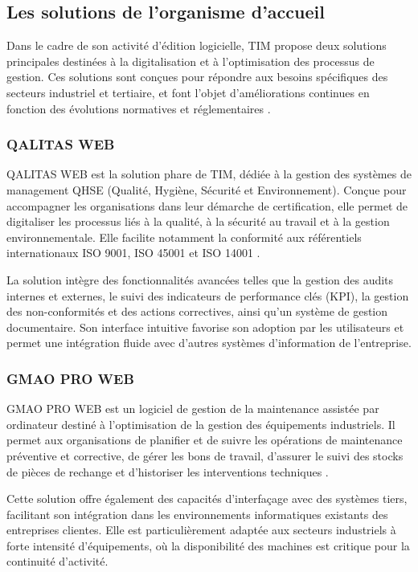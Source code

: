 \documentclass[12pt,a4paper]{report}
\begin{document}
\subsection{Les solutions de l'organisme d'accueil}

Dans le cadre de son activité d'édition logicielle, TIM propose deux solutions principales destinées à la digitalisation et à l'optimisation des processus de gestion. Ces solutions sont conçues pour répondre aux besoins spécifiques des secteurs industriel et tertiaire, et font l'objet d'améliorations continues en fonction des évolutions normatives et réglementaires \cite{tim_site}.

\subsubsection{QALITAS WEB}

QALITAS WEB est la solution phare de TIM, dédiée à la gestion des systèmes de management QHSE (Qualité, Hygiène, Sécurité et Environnement). Conçue pour accompagner les organisations dans leur démarche de certification, elle permet de digitaliser les processus liés à la qualité, à la sécurité au travail et à la gestion environnementale. Elle facilite notamment la conformité aux référentiels internationaux ISO 9001, ISO 45001 et ISO 14001 \cite{qalitas_doc}.

La solution intègre des fonctionnalités avancées telles que la gestion des audits internes et externes, le suivi des indicateurs de performance clés (KPI), la gestion des non-conformités et des actions correctives, ainsi qu'un système de gestion documentaire. Son interface intuitive favorise son adoption par les utilisateurs et permet une intégration fluide avec d'autres systèmes d'information de l'entreprise.

\subsubsection{GMAO PRO WEB}

GMAO PRO WEB est un logiciel de gestion de la maintenance assistée par ordinateur destiné à l'optimisation de la gestion des équipements industriels. Il permet aux organisations de planifier et de suivre les opérations de maintenance préventive et corrective, de gérer les bons de travail, d'assurer le suivi des stocks de pièces de rechange et d'historiser les interventions techniques \cite{gmao_doc}.

Cette solution offre également des capacités d'interfaçage avec des systèmes tiers, facilitant son intégration dans les environnements informatiques existants des entreprises clientes. Elle est particulièrement adaptée aux secteurs industriels à forte intensité d'équipements, où la disponibilité des machines est critique pour la continuité d'activité.
\end{document}
